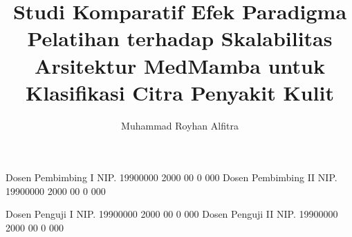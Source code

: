 \documentclass{report} %
\begin{document}
    
    \title{Studi Komparatif Efek Paradigma Pelatihan terhadap Skalabilitas Arsitektur MedMamba untuk Klasifikasi Citra Penyakit Kulit}
    
	\author{Muhammad Royhan Alfitra}		%
	
	\dosbingA%
		{Dosen Pembimbing I}%
		{NIP. 19900000 2000 00 0 000}	%
	\dosbingB%
		{Dosen Pembimbing II}%
		{NIP. 19900000 2000 00 0 000}	%
		
	\pengujiA%
		{Dosen Penguji I}%
		{NIP. 19900000 2000 00 0 000}	%
	\pengujiB%
		{Dosen Penguji II}%
		{NIP. 19900000 2000 00 0 000}	%

	\sloppy %
    \setcounter{page}{1} %
\end{document}
